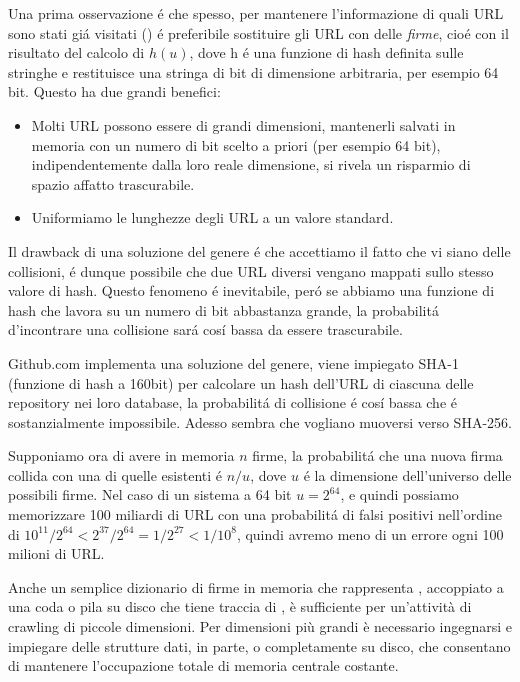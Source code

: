 Una prima osservazione é che spesso, per mantenere l'informazione di quali URL sono stati giá visitati () é preferibile sostituire gli URL con delle \textit{firme}, cioé con il risultato del calcolo di $h(u)$, dove h é una funzione di hash definita sulle stringhe e restituisce una stringa di bit di dimensione arbitraria, per esempio 64 bit. Questo ha due grandi benefici:
\begin{itemize}
    \item Molti URL possono essere di grandi dimensioni, mantenerli salvati in memoria con un numero di bit scelto a priori (per esempio 64 bit), indipendentemente dalla loro reale dimensione, si rivela un risparmio di spazio affatto trascurabile.
    \item Uniformiamo le lunghezze degli URL a un valore standard.
\end{itemize}
Il drawback di una soluzione del genere é che accettiamo il fatto che vi siano delle collisioni, é dunque possibile che due URL diversi vengano mappati sullo stesso valore di hash. Questo fenomeno é inevitabile, peró se abbiamo una funzione di hash che lavora su un numero di bit abbastanza grande, la probabilitá d'incontrare una collisione sará cosí bassa da essere trascurabile.

Github.com implementa una soluzione del genere, viene impiegato SHA-1 (funzione di hash a 160bit) per calcolare un hash dell'URL di ciascuna delle repository nei loro database, la probabilitá di collisione é cosí bassa che é sostanzialmente impossibile. Adesso sembra che vogliano muoversi verso SHA-256.

Supponiamo ora di avere in memoria $n$ firme, la probabilitá che una nuova firma collida con una di quelle esistenti é $n/u$, dove $u$ é la dimensione dell'universo delle possibili firme. Nel caso di un sistema a 64 bit $u = 2^{64}$, e quindi possiamo memorizzare 100 miliardi di URL con una probabilitá di falsi positivi nell'ordine di $10^{11} / 2^{64} < 2^{37} / 2^{64} = 1 / 2^{27} < 1 / 10^8$, quindi avremo meno di un errore ogni 100 milioni di URL.

Anche un semplice dizionario di firme in memoria che rappresenta , accoppiato a una coda o pila su disco che tiene traccia di , è sufficiente per un'attività di crawling di piccole dimensioni. Per dimensioni più grandi è necessario ingegnarsi e impiegare delle strutture dati, in parte, o completamente su disco, che consentano di mantenere l'occupazione totale di memoria centrale costante.

